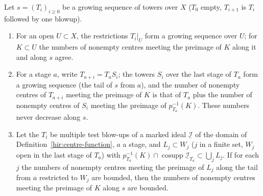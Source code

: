 \begin{lemma}
\label{bcalc:growing-seq-tail}
\mixedleanok
Let \(s=(T_i)_{i\ge0}\) be a growing sequence of towers over \(X\) (\(T_0\) empty, \(T_{i+1}\) is \(T_i\) followed by one blowup).
\begin{enumerate}
\item For an open \(U\subset X\), the restrictions \(T_i|_U\) form a growing sequence over \(U\); for \(K\subset U\) the numbers of nonempty centres meeting the
preimage of \(K\) along it and along \(s\) agree.
\item For a stage \(a\), write \(T_{a+i}=T_aS_i\); the towers \(S_i\) over the last stage of \(T_a\) form a growing sequence (the tail of \(s\) from \(a\)), and the number of
nonempty centres of \(T_{a+i}\) meeting the preimage of \(K\) is that of \(T_a\) plus the number of nonempty centres of \(S_i\) meeting the preimage of \(p_{T_a}^{-1}(K)\).
These numbers never decrease along \(s\).
\item Let the \(T_i\) be multiple test blow-ups of a marked ideal \(\underline{\mathcal I}\) of the domain of Definition~\ref{hir:centre-function}, \(a\) a stage, and
\(L_j\subset W_j\) (\(j\) in a finite set, \(W_j\) open in the last stage of \(T_a\)) with \(p_{T_a}^{-1}(K)\cap\operatorname{cosupp}\underline{\mathcal I}_{T_a}\subset\bigcup_jL_j\). If for
each \(j\) the numbers of nonempty centres meeting the preimage of \(L_j\) along the tail from \(a\) restricted to \(W_j\) are bounded, then the numbers of nonempty
centres meeting the preimage of \(K\) along \(s\) are bounded.
\end{enumerate}
\end{lemma}
